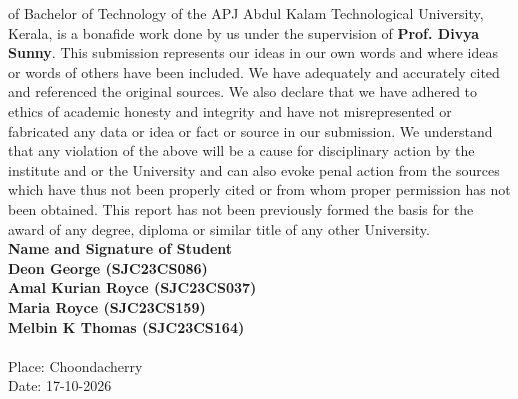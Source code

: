 of Bachelor of Technology of the APJ Abdul Kalam Technological University, Kerala, is a bonafide
work done by us under the supervision of\textbf{ Prof. Divya Sunny}. This submission
represents our ideas in our own words and where ideas or words of others have been included. We have
adequately and accurately cited and referenced the original sources. We also declare that we have adhered to
ethics of academic honesty and integrity and have not misrepresented or fabricated any data or idea or
fact or source in our submission. We understand that any violation of the above will be a cause for
disciplinary action by the institute and or the University and can also evoke penal action from the sources
which have thus not been properly cited or from whom proper permission has not been obtained. This
report has not been previously formed the basis for the award of any degree, diploma or similar title of
any other University.\vspace{1.3 cm}\\
{\bf Name and Signature of Student}\vspace{0.5cm}\\
  \textbf{\bf Deon George (SJC23CS086)}\\
{\bf Amal Kurian Royce (SJC23CS037)}\\
{\bf Maria Royce (SJC23CS159)}\\
{\bf Melbin K Thomas (SJC23CS164)}\\
    \vspace{2 cm}\\
Place: Choondacherry\\
Date: 17-10-2026 
 

